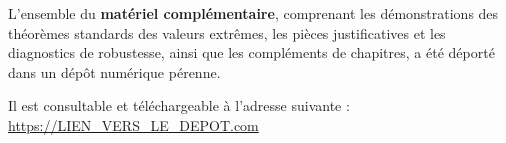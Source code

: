 \documentclass[11pt,a4paper]{report}
\begin{document}
L'ensemble du \textbf{matériel complémentaire}, comprenant les démonstrations des théorèmes
standards des valeurs extrêmes, les pièces justificatives et les diagnostics de robustesse,
ainsi que les compléments de chapitres, a été déporté dans un dépôt numérique pérenne.

Il est consultable et téléchargeable à l'adresse suivante :
\url{https://LIEN_VERS_LE_DEPOT.com}



{\NoAutoSpacing}
\end{document}

